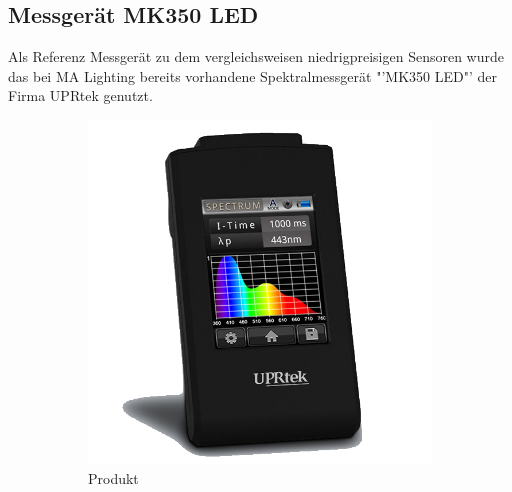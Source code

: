\documentclass[11pt]{scrartcl}
\begin{document}
\subsection{Messgerät MK350 LED}
Als Referenz Messgerät zu dem vergleichsweisen niedrigpreisigen Sensoren wurde das bei MA Lighting bereits vorhandene Spektralmessgerät
"'MK350 LED"' der Firma UPRtek genutzt.\\
\begin{figure}[H]
    \centering
    \begin{subfigure}[b]{0.49\textwidth}
        \includegraphics[width=\textwidth]{images/MK350N_Basic_Handheld_Spectrometer.png}
        \caption{Produkt \cite{uprtek}}
    \end{subfigure}
    \hfill 
    \begin{subfigure}[b]{0.49\textwidth}

\end{subfigure}
\end{figure}
\end{document}
